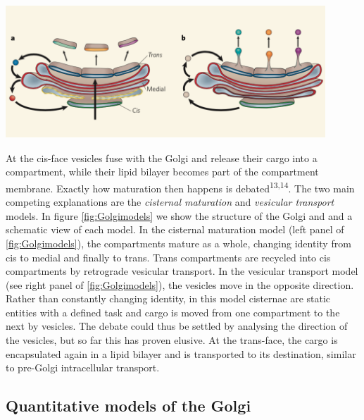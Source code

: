 \documentclass{Dissertate}
\let\origfigure\figure
\let\endorigfigure\endfigure
\renewenvironment{figure}[1][2] {
    \expandafter\origfigure\expandafter[H]
} {
    \endorigfigure
}
\begin{document}
\begin{figure}
\hypertarget{fig:Golgimodels}{%
\centering
\includegraphics[width=0.9\textwidth]{source/figures/png/Golgimodels.png}
\caption{\textbf{Left panel}: In the cisternal maturation model,
compartments mature as a whole and thus change identity. \textbf{Right
panel}: In the vesicle transport model, compartments are static objects
and cargo is being transported from compartment to compartment by
vesicles. Image taken from 13.}\label{fig:Golgimodels}
}
\end{figure}

At the cis-face vesicles fuse with the Golgi and release their cargo
into a compartment, while their lipid bilayer becomes part of the
compartment membrane. Exactly how maturation then happens is debated\textsuperscript{13,14}. The two main competing
explanations are the \emph{cisternal maturation} and \emph{vesicular
transport} models. In figure \ref{fig:Golgimodels} we show the
structure of the Golgi and and a schematic view of each model. In the
cisternal maturation model (left panel of \ref{fig:Golgimodels}),
the compartments mature as a whole, changing identity from cis to medial
and finally to trans. Trans compartments are recycled into cis
compartments by retrograde vesicular transport. In the vesicular
transport model (see right panel of \ref{fig:Golgimodels}), the
vesicles move in the opposite direction. Rather than constantly changing
identity, in this model cisternae are static entities with a defined
task and cargo is moved from one compartment to the next by vesicles.
The debate could thus be settled by analysing the direction of the
vesicles, but so far this has proven elusive. At the trans-face, the cargo is encapsulated again in a lipid bilayer
and is transported to its destination, similar to pre-Golgi
intracellular transport.


\hypertarget{quantitative-models-of-the-Golgi}{%
\subsection{Quantitative models of the
Golgi}\label{quantitative-models-of-the-Golgi}}
\end{document}
